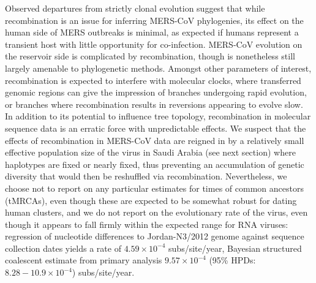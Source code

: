 \documentclass[9pt,lineno]{elife}
\begin{document}
Observed departures from strictly clonal evolution suggest that while recombination is an issue for inferring MERS-CoV phylogenies, its effect on the human side of MERS outbreaks is minimal, as expected if humans represent a transient host with little opportunity for co-infection.
MERS-CoV evolution on the reservoir side is complicated by recombination, though is nonetheless still largely amenable to phylogenetic methods.
Amongst other parameters of interest, recombination is expected to interfere with molecular clocks, where transferred genomic regions can give the impression of branches undergoing rapid evolution, or branches where recombination results in reversions appearing to evolve slow.
In addition to its potential to influence tree topology, recombination in molecular sequence data is an erratic force with unpredictable effects.
We suspect that the effects of recombination in MERS-CoV data are reigned in by a relatively small effective population size of the virus in Saudi Arabia (see next section) where haplotypes are fixed or nearly fixed, thus preventing an accumulation of genetic diversity that would then be reshuffled via recombination.
Nevertheless, we choose not to report on any particular estimates for times of common ancestors (tMRCAs), even though these are expected to be somewhat robust for dating human clusters, and we do not report on the evolutionary rate of the virus, even though it appears to fall firmly within the expected range for RNA viruses: regression of nucleotide differences to Jordan-N3/2012 genome against sequence collection dates yields a rate of $4.59 \times 10^{-4}$ subs/site/year, Bayesian structured coalescent estimate from primary analysis $9.57 \times 10^{-4}$ (95\% HPDs: $8.28-10.9 \times 10^{-4}$) subs/site/year.
\end{document}

